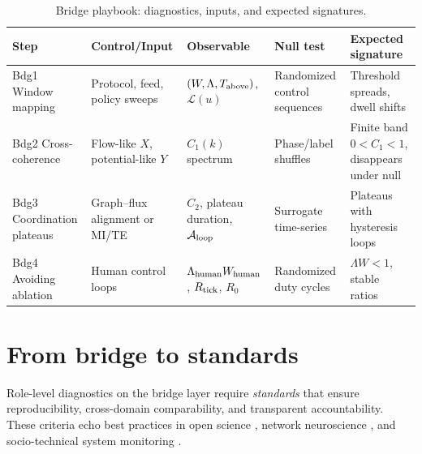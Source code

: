 \documentclass[12pt,a4paper,oneside]{scrreprt}
\begin{document}
\begin{table}[h]
\centering
\caption{Bridge playbook: diagnostics, inputs, and expected signatures.}
\begin{tabular}{p{2.2cm} p{3.2cm} p{3.2cm} p{3.2cm} p{3.2cm}}
\toprule
\textbf{Step} & \textbf{Control/Input} & \textbf{Observable} & \textbf{Null test} & \textbf{Expected signature} \\
\midrule
Bdg1 Window mapping & Protocol, feed, policy sweeps & $(W,\Lambda,T_{\rm above})$, $\mathcal L(u)$ & Randomized control sequences & Threshold spreads, dwell shifts \\
Bdg2 Cross-coherence & Flow-like $X$, potential-like $Y$ & $C_1(k)$ spectrum & Phase/label shuffles & Finite band $0<C_1<1$, disappears under null \\
Bdg3 Coordination plateaus & Graph–flux alignment or MI/TE & $C_2$, plateau duration, $\mathcal A_{\rm loop}$ & Surrogate time-series & Plateaus with hysteresis loops \\
Bdg4 Avoiding ablation & Human control loops & $\Lambda_{\rm human} W_{\rm human}$, $R_{\rm tick}$, $R_0$ & Randomized duty cycles & $\Lambda W < 1$, stable ratios \\
\bottomrule
\end{tabular}
\end{table}

\section{From bridge to standards}\label{sec:bridge-standards}

Role-level diagnostics on the bridge layer require \emph{standards} that ensure reproducibility, cross-domain comparability, and transparent accountability. These criteria echo best practices in open science \cite{OpenScience2015}, network neuroscience \cite{Bassett2017}, and socio-technical system monitoring \cite{Helbing2015}.
\end{document}
